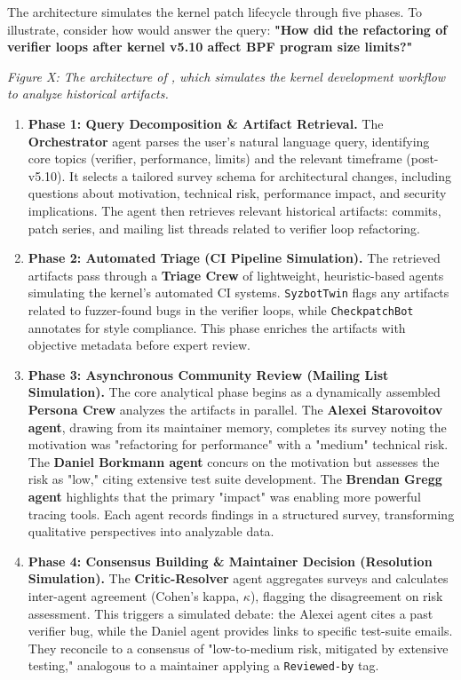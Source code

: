The \sys architecture simulates the kernel patch lifecycle through five phases. To illustrate, consider how \sys would answer the query: \textbf{"How did the refactoring of verifier loops after kernel v5.10 affect BPF program size limits?"}

\emph{Figure X: The architecture of \sys, which simulates the kernel development workflow to analyze historical artifacts.}

\begin{enumerate}
\item \textbf{Phase 1: Query Decomposition \& Artifact Retrieval.} The \textbf{Orchestrator} agent parses the user's natural language query, identifying core topics (verifier, performance, limits) and the relevant timeframe (post-v5.10). It selects a tailored survey schema for architectural changes, including questions about motivation, technical risk, performance impact, and security implications. The agent then retrieves relevant historical artifacts: commits, patch series, and mailing list threads related to verifier loop refactoring.

\item \textbf{Phase 2: Automated Triage (CI Pipeline Simulation).} The retrieved artifacts pass through a \textbf{Triage Crew} of lightweight, heuristic-based agents simulating the kernel's automated CI systems. \texttt{SyzbotTwin} flags any artifacts related to fuzzer-found bugs in the verifier loops, while \texttt{CheckpatchBot} annotates for style compliance. This phase enriches the artifacts with objective metadata before expert review.

\item \textbf{Phase 3: Asynchronous Community Review (Mailing List Simulation).} The core analytical phase begins as a dynamically assembled \textbf{Persona Crew} analyzes the artifacts in parallel. The \textbf{Alexei Starovoitov agent}, drawing from its maintainer memory, completes its survey noting the motivation was "refactoring for performance" with a "medium" technical risk. The \textbf{Daniel Borkmann agent} concurs on the motivation but assesses the risk as "low," citing extensive test suite development. The \textbf{Brendan Gregg agent} highlights that the primary "impact" was enabling more powerful tracing tools. Each agent records findings in a structured survey, transforming qualitative perspectives into analyzable data.

\item \textbf{Phase 4: Consensus Building \& Maintainer Decision (Resolution Simulation).} The \textbf{Critic-Resolver} agent aggregates surveys and calculates inter-agent agreement (Cohen's kappa, $\kappa$), flagging the disagreement on risk assessment. This triggers a simulated debate: the Alexei agent cites a past verifier bug, while the Daniel agent provides links to specific test-suite emails. They reconcile to a consensus of "low-to-medium risk, mitigated by extensive testing," analogous to a maintainer applying a \texttt{Reviewed-by} tag.


\end{enumerate}
